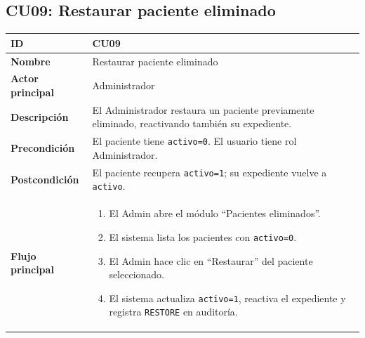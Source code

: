 \documentclass[11pt,a4paper]{article}
\begin{document}
\subsection*{CU09: Restaurar paciente eliminado}
\begin{longtable}{|L{3.5cm}|L{10cm}|}
    \hline
    \textbf{ID}              & CU09                                                                                            \\ \hline
    \textbf{Nombre}          & Restaurar paciente eliminado                                                                    \\ \hline
    \textbf{Actor principal} & Administrador                                                                                   \\ \hline
    \textbf{Descripción}     & El Administrador restaura un paciente previamente eliminado, reactivando también su expediente. \\ \hline
    \textbf{Precondición}    & El paciente tiene \texttt{activo=0}. El usuario tiene rol Administrador.                        \\ \hline
    \textbf{Postcondición}   & El paciente recupera \texttt{activo=1}; su expediente vuelve a \texttt{activo}.                 \\ \hline
    \textbf{Flujo principal} &
    \begin{enumerate}
        \item El Admin abre el módulo ``Pacientes eliminados''.
        \item El sistema lista los pacientes con \texttt{activo=0}.
        \item El Admin hace clic en ``Restaurar'' del paciente seleccionado.
        \item El sistema actualiza \texttt{activo=1}, reactiva el expediente y registra \texttt{RESTORE} en auditoría.
    \end{enumerate}          \\ \hline
\end{longtable}

\end{document}
